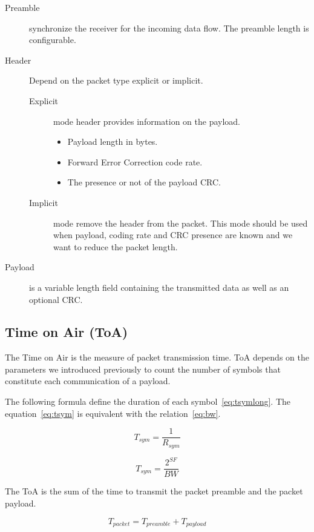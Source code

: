 \begin{description}
  \item[Preamble] synchronize the receiver for the incoming data flow. The
    preamble length is configurable.
  \item[Header] Depend on the packet type explicit or implicit.
  \begin{description}
    \item[Explicit] mode header provides information on the payload.
    \begin{itemize}
      \item Payload length in bytes.
      \item Forward Error Correction code rate.
      \item The presence or not of the payload CRC.
    \end{itemize}
    \item[Implicit] mode remove the header from the packet. This mode should be
      used when payload, coding rate and CRC presence are known and we want to
      reduce the packet length.
  \end{description}
  \item[Payload] is a variable length field containing the transmitted data as
    well as an optional CRC.
\end{description}

\subsection{Time on Air (ToA)}

The Time on Air is the measure of packet transmission time.
ToA depends on the parameters we introduced previously to count the number of
symbols that constitute each communication of a payload.

The following formula define the duration of each symbol~\ref{eq:tsymlong}.
The equation~\ref{eq:tsym} is equivalent with the relation~\ref{eq:bw}.

\begin{equation}
  \label{eq:tsymlong}
  T_{sym} = \frac{1}{R_{sym}}
\end{equation}

\begin{equation}
  \label{eq:tsym}
  T_{sym} = \frac{2^{SF}}{BW}
\end{equation}

The ToA is the sum of the time to transmit the packet preamble and the packet
payload.

\begin{equation}
  \label{eq:tpacket}
  T_{packet} = T_{preamble} + T_{payload}
\end{equation}

